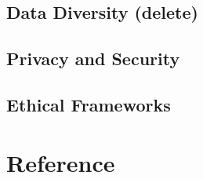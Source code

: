 \documentclass[
]{book}
\begin{document}
\hypertarget{data-diversity-delete}{%
\section{Data Diversity (delete)}\label{data-diversity-delete}}

\hypertarget{privacy-and-security}{%
\section{Privacy and Security}\label{privacy-and-security}}

\hypertarget{ethical-frameworks}{%
\section{Ethical Frameworks}\label{ethical-frameworks}}

\hypertarget{reference}{%
\chapter{Reference}\label{reference}}

  
\end{document}
